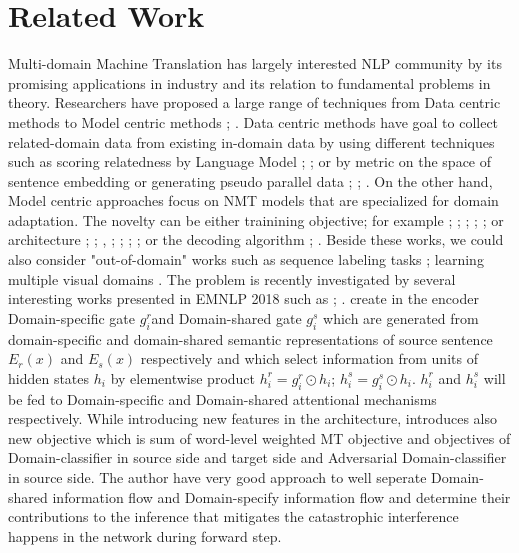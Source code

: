 \documentclass[11pt,a4paper]{article}
\begin{document}
\section{Related Work}
Multi-domain Machine Translation has largely interested NLP community by its promising applications in industry and its relation to fundamental problems in theory. Researchers have proposed a large range of techniques from Data centric methods to Model centric methods \cite{C18-1111}; \cite{P17-2061}. Data centric methods have goal to collect related-domain data from existing in-domain data by using different techniques such as scoring relatedness by Language Model \cite{P10-2041}; \cite{D11-1033}; \cite{P13-2119} or by metric on the space of sentence embedding \cite{P17-2089} or generating pseudo parallel data \cite{P03-1010}; \cite{C16-1295}; \cite{D14-1023}. On the other hand, Model centric approaches focus on NMT models that are specialized for domain adaptation. The novelty can be either trainining objective; for example \cite{Luong2015SNMT}; \cite{P16-1009}; \cite{D17-1155}; \cite{W17-3205}; \cite{D17-1156}; \cite{C18-1269} or architecture \cite{R17-1049}; \cite{gulcehre2016monolingual}; \cite{W17-4712}, \cite{Biao2017CARENMT}; \cite{N18-2080}; \cite{W18-6313}; \cite{C16-1170}; \cite{P18-2050} or the decoding algorithm \cite{gulcehre2016monolingual}; \cite{I17-2004}. Beside these works, we could also consider "out-of-domain" works such as sequence labeling tasks \cite{P07-1033}; learning multiple visual domains \cite{NIPS2017_6654}. The problem is recently investigated by several interesting works presented in EMNLP 2018 such as \cite{D18-1039}; \cite{D18-1041}. \cite{D18-1041} create in the encoder Domain-specific gate $g^r_i$and Domain-shared gate $g^s_i$ which are generated from domain-specific and domain-shared semantic representations of source sentence $E_r(x)$ and $E_s(x)$ respectively and which select information from units of hidden states $h_i$ by elementwise product $h^r_i = g^r_i \odot h_i$; $h^s_i = g^s_i \odot h_i$. $h^r_i$ and $h^s_i$ will be fed to Domain-specific and Domain-shared attentional mechanisms respectively. While introducing new features in the architecture, \cite{D18-1041} introduces also new objective which is sum of word-level weighted MT objective and objectives of Domain-classifier in source side and target side and Adversarial Domain-classifier in source side. The author have very good approach to well seperate Domain-shared information flow and Domain-specify information flow and determine their contributions to the inference that mitigates the catastrophic interference happens in the network during forward step. 
\end{document}
